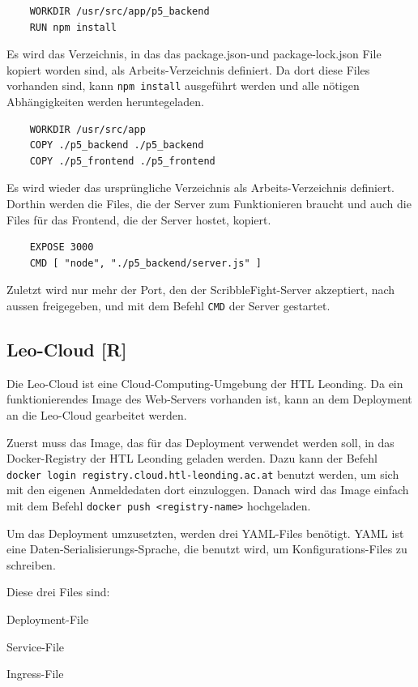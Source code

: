 \begin{lstlisting}
    WORKDIR /usr/src/app/p5_backend
    RUN npm install
\end{lstlisting}
Es wird das Verzeichnis, in das das package.json-und package-lock.json File kopiert worden sind, als Arbeits-Verzeichnis definiert.
Da dort diese Files vorhanden sind, kann \texttt{npm install} ausgeführt werden und alle nötigen Abhängigkeiten werden heruntegeladen. \\

\begin{lstlisting}
    WORKDIR /usr/src/app
    COPY ./p5_backend ./p5_backend
    COPY ./p5_frontend ./p5_frontend
\end{lstlisting}

Es wird wieder das ursprüngliche Verzeichnis als Arbeits-Verzeichnis definiert. Dorthin werden die Files, die der Server zum Funktionieren braucht und auch die Files für das Frontend, die der Server hostet, kopiert. \\

\begin{lstlisting}
    EXPOSE 3000
    CMD [ "node", "./p5_backend/server.js" ]
\end{lstlisting}

Zuletzt wird nur mehr der Port, den der ScribbleFight-Server akzeptiert, nach aussen freigegeben, und mit dem Befehl \texttt{CMD} der Server gestartet. \cite{build_image}

\subsection{Leo-Cloud [R]}
Die Leo-Cloud ist eine Cloud-Computing-Umgebung der HTL Leonding.
Da ein funktionierendes Image des Web-Servers vorhanden ist, kann an dem Deployment an die Leo-Cloud gearbeitet werden.

Zuerst muss das Image, das für das Deployment verwendet werden soll, in das Docker-Registry der HTL Leonding geladen werden.
Dazu kann der Befehl \texttt{docker login registry.cloud.htl-leonding.ac.at} benutzt werden, um sich mit den eigenen Anmeldedaten dort einzuloggen.
Danach wird das Image einfach mit dem Befehl \texttt{docker push <registry-name>} hochgeladen.

Um das Deployment umzusetzten, werden drei YAML-Files benötigt.
YAML ist eine Daten-Serialisierungs-Sprache, die benutzt wird, um Konfigurations-Files zu schreiben.

Diese drei Files sind:
\begin{compactitem}
    \item Deployment-File
    \item Service-File
    \item Ingress-File
\end{compactitem}


